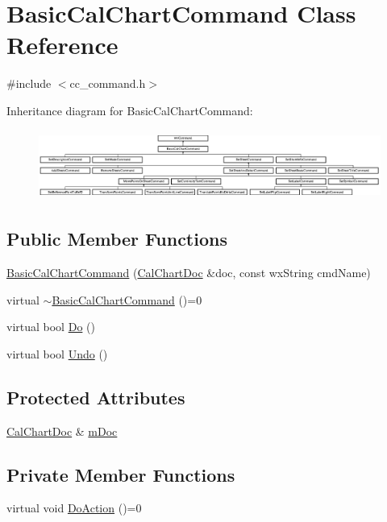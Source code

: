 \hypertarget{a00018}{\section{Basic\-Cal\-Chart\-Command Class Reference}
\label{a00018}
}


{\ttfamily \#include $<$cc\-\_\-command.\-h$>$}

Inheritance diagram for Basic\-Cal\-Chart\-Command\-:\begin{figure}[H]
\begin{center}
\leavevmode
\includegraphics[height=2.296651cm]{a00018}
\end{center}
\end{figure}
\subsection*{Public Member Functions}
\begin{DoxyCompactItemize}
\item 
\hyperlink{a00018_a176cb9a986d1b043dd6d5350f3316bb9}{Basic\-Cal\-Chart\-Command} (\hyperlink{a00020}{Cal\-Chart\-Doc} \&doc, const wx\-String cmd\-Name)
\item 
virtual \hyperlink{a00018_a86f682185344e0b3eded54702d7b1f16}{$\sim$\-Basic\-Cal\-Chart\-Command} ()=0
\item 
virtual bool \hyperlink{a00018_a4e672c037f38626e4b8634c9613ea34e}{Do} ()
\item 
virtual bool \hyperlink{a00018_adfffde377bdc935cf06490667de1d7b6}{Undo} ()
\end{DoxyCompactItemize}
\subsection*{Protected Attributes}
\begin{DoxyCompactItemize}
\item 
\hyperlink{a00020}{Cal\-Chart\-Doc} \& \hyperlink{a00018_ab9f5e00f2b86c92e0051f56b889d1a13}{m\-Doc}
\end{DoxyCompactItemize}
\subsection*{Private Member Functions}
\begin{DoxyCompactItemize}
\item 
virtual void \hyperlink{a00018_ab6f65965601103020ea8276abf88313a}{Do\-Action} ()=0
\end{DoxyCompactItemize}
